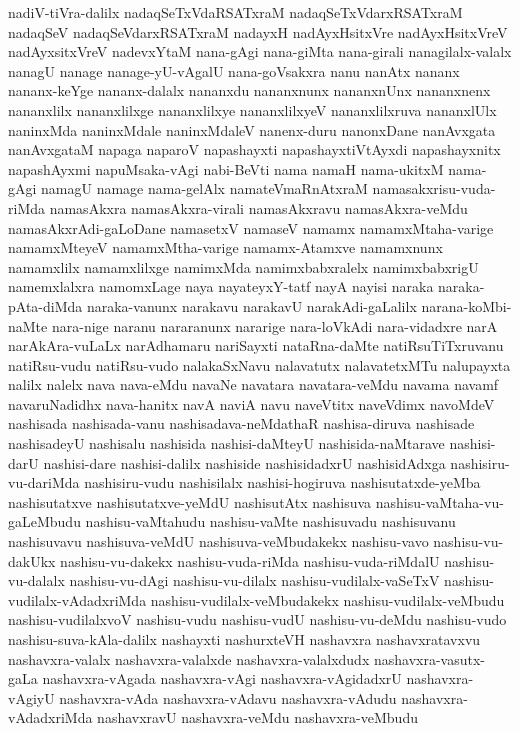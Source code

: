 {nadiV-tiVra-dalilx
nadaqSeTxVdaRSATxraM
nadaqSeTxVdarxRSATxraM
nadaqSeV
nadaqSeVdarxRSATxraM
nadayxH
nadAyxHsitxVre
nadAyxHsitxVreV
nadAyxsitxVreV
nadevxYtaM
nana-gAgi
nana-giMta
nana-girali
nanagilalx-valalx
nanagU
nanage
nanage-yU-vAgalU
nana-goVsakxra
nanu
nanAtx
nananx
nananx-keYge
nananx-dalalx
nananxdu
nananxnunx
nananxnUnx
nananxnenx
nananxlilx
nananxlilxge
nananxlilxye
nananxlilxyeV
nananxlilxruva
nananxlUlx
naninxMda
naninxMdale
naninxMdaleV
nanenx-duru
nanonxDane
nanAvxgata
nanAvxgataM
napaga
naparoV
napashayxti
napashayxtiVtAyxdi
napashayxnitx
napashAyxmi
napuMsaka-vAgi
nabi-BeVti
nama
namaH
nama-ukitxM
nama-gAgi
namagU
namage
nama-gelAlx
namateVmaRnAtxraM
namasakxrisu-vuda-riMda
namasAkxra
namasAkxra-virali
namasAkxravu
namasAkxra-veMdu
namasAkxrAdi-gaLoDane
namasetxV
namaseV
namamx
namamxMtaha-varige
namamxMteyeV
namamxMtha-varige
namamx-Atamxve
namamxnunx
namamxlilx
namamxlilxge
namimxMda
namimxbabxralelx
namimxbabxrigU
namemxlalxra
namomxLage
naya
nayateyxY-tatf
nayA
nayisi
naraka
naraka-pAta-diMda
naraka-vanunx
narakavu
narakavU
narakAdi-gaLalilx
narana-koMbi-naMte
nara-nige
naranu
nararanunx
nararige
nara-loVkAdi
nara-vidadxre
narA
narAkAra-vuLaLx
narAdhamaru
nariSayxti
nataRna-daMte
natiRsuTiTxruvanu
natiRsu-vudu
natiRsu-vudo
nalakaSxNavu
nalavatutx
nalavatetxMTu
nalupayxta
nalilx
nalelx
nava
nava-eMdu
navaNe
navatara
navatara-veMdu
navama
navamf
navaruNadidhx
nava-hanitx
navA
naviA
navu
naveVtitx
naveVdimx
navoMdeV
nashisada
nashisada-vanu
nashisadava-neMdathaR
nashisa-diruva
nashisade
nashisadeyU
nashisalu
nashisida
nashisi-daMteyU
nashisida-naMtarave
nashisi-darU
nashisi-dare
nashisi-dalilx
nashiside
nashisidadxrU
nashisidAdxga
nashisiru-vu-dariMda
nashisiru-vudu
nashisilalx
nashisi-hogiruva
nashisutatxde-yeMba
nashisutatxve
nashisutatxve-yeMdU
nashisutAtx
nashisuva
nashisu-vaMtaha-vu-gaLeMbudu
nashisu-vaMtahudu
nashisu-vaMte
nashisuvadu
nashisuvanu
nashisuvavu
nashisuva-veMdU
nashisuva-veMbudakekx
nashisu-vavo
nashisu-vu-dakUkx
nashisu-vu-dakekx
nashisu-vuda-riMda
nashisu-vuda-riMdalU
nashisu-vu-dalalx
nashisu-vu-dAgi
nashisu-vu-dilalx
nashisu-vudilalx-vaSeTxV
nashisu-vudilalx-vAdadxriMda
nashisu-vudilalx-veMbudakekx
nashisu-vudilalx-veMbudu
nashisu-vudilalxvoV
nashisu-vudu
nashisu-vudU
nashisu-vu-deMdu
nashisu-vudo
nashisu-suva-kAla-dalilx
nashayxti
nashurxteVH
nashavxra
nashavxratavxvu
nashavxra-valalx
nashavxra-valalxde
nashavxra-valalxdudx
nashavxra-vasutx-gaLa
nashavxra-vAgada
nashavxra-vAgi
nashavxra-vAgidadxrU
nashavxra-vAgiyU
nashavxra-vAda
nashavxra-vAdavu
nashavxra-vAdudu
nashavxra-vAdadxriMda
nashavxravU
nashavxra-veMdu
nashavxra-veMbudu
}
